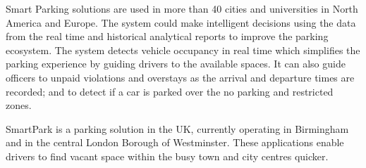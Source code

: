 Smart Parking solutions are used in more than 40 cities and universities in North America and Europe. The system could make intelligent decisions using the data from the real time and historical analytical reports to improve the parking ecosystem. The system detects vehicle occupancy in real time which simplifies the parking experience by guiding drivers to the available spaces. It can also guide officers to unpaid violations and overstays as the arrival and departure times are recorded; and to detect if a car is parked over the no parking and restricted zones. 

SmartPark is a parking solution in the UK, currently operating in Birmingham and in the central London Borough of Westminster. These applications enable drivers to find vacant space within the busy town and city centres quicker.


